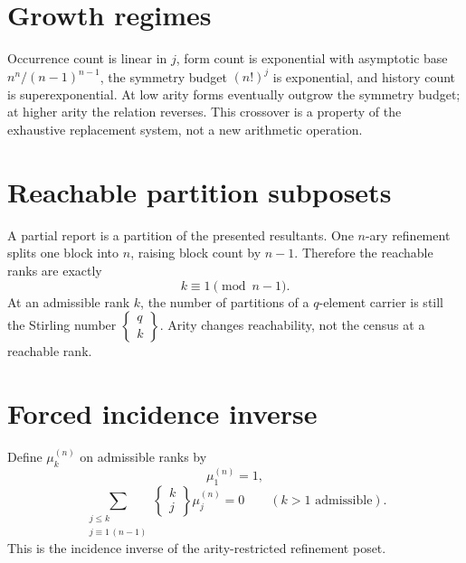 \documentclass[11pt,a4paper]{article}
\begin{document}
\section{Growth regimes}
Occurrence count is linear in $j$, form count is exponential with asymptotic base $n^n/(n-1)^{n-1}$, the symmetry budget $(n!)^j$ is exponential, and history count is superexponential. At low arity forms eventually outgrow the symmetry budget; at higher arity the relation reverses. This crossover is a property of the exhaustive replacement system, not a new arithmetic operation.

\section{Reachable partition subposets}
A partial report is a partition of the presented resultants. One $n$-ary refinement splits one block into $n$, raising block count by $n-1$. Therefore the reachable ranks are exactly
\begin{equation}
\boxed{k\equiv1\pmod{n-1}.}
\end{equation}
At an admissible rank $k$, the number of partitions of a $q$-element carrier is still the Stirling number $\left\{\begin{smallmatrix}q\\k\end{smallmatrix}\right\}$. Arity changes reachability, not the census at a reachable rank.

\section{Forced incidence inverse}
Define $\mu_k^{(n)}$ on admissible ranks by
\begin{equation}
\mu_1^{(n)}=1,
\end{equation}
\begin{equation}
\sum_{\substack{j\le k\\j\equiv1\,(n-1)}}
\left\{\begin{matrix}k\\j\end{matrix}\right\}\mu_j^{(n)}=0
\qquad(k>1\text{ admissible}).
\end{equation}
This is the incidence inverse of the arity-restricted refinement poset.
\end{document}
